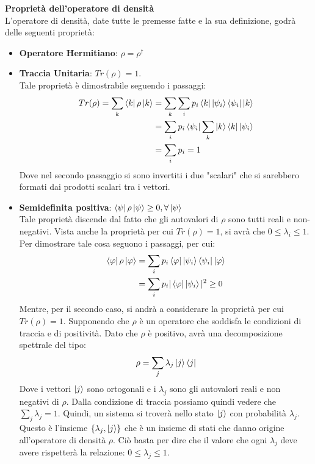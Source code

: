 \newpage
\begin{info}
\textbf{Proprietà dell'operatore di densità}\\
L'operatore di densità, date tutte le premesse fatte e la sua definizione, godrà delle seguenti proprietà:
\begin{itemize}
       \item \textbf{Operatore Hermitiano}: \(\rho = \rho^\dagger\)
       
       \item \textbf{Traccia Unitaria}: \(Tr(\rho) = 1\).\\
       Tale proprietà è dimostrabile seguendo i passaggi:
       \begin{align*}
              Tr(\rho)=\sum_{k} \bra{k}\rho\ket{k}&=\sum_{k}\sum_{i}p_i \bra{k}\ket{\psi_i}\bra{\psi_i}\ket{k}\\
              &= \sum_{i}p_i \bra{\psi_i}\sum_{k}\ket{k}\bra{k}\ket{\psi_i}\\
              &=\sum_{i} p_i = 1
       \end{align*}
       Dove nel secondo passaggio si sono invertiti i due "scalari" che si sarebbero formati dai prodotti scalari tra i vettori.

       \item \textbf{Semidefinita positiva}: \(\bra{\psi}\rho \ket{\psi} \ge 0, \forall \ket{\psi}\)\\
       Tale proprietà discende dal fatto che gli autovalori di \(\rho\) sono tutti reali e non-negativi. Vista anche la proprietà per cui \(Tr(\rho)=1\), si avrà che \(0 \le \lambda_i \le 1\). Per dimostrare tale cosa seguono i passaggi, per cui:
       \begin{align*}
              \bra{\varphi}\rho\ket{\varphi} &=\sum_{i} p_i \bra{\varphi} \ket{\psi_i}\bra{\psi_i}\ket{\varphi}\\
              &= \sum_{i} p_i |\bra{\varphi}\ket{\psi_i}|^2 \ge 0
       \end{align*}
       Mentre, per il secondo caso, si andrà a considerare la proprietà per cui \(Tr(\rho)=1\). Supponendo che \(\rho\) è un operatore che soddisfa le condizioni di traccia e di positività. Dato che \(\rho\) è positivo, avrà una decomposizione spettrale del tipo:
       \begin{gather*}
       \rho = \sum_{j}\lambda_j \ket{j}\bra{j}
       \end{gather*}
       Dove i vettori \(\ket{j}\) sono ortogonali e i \(\lambda_j\) sono gli autovalori reali e non negativi di \(\rho\).
       Dalla condizione di traccia possiamo quindi vedere che \(\sum_{j}\lambda_j = 1\). Quindi, un sistema si troverà nello stato \(\ket{j}\) con probabilità \(\lambda_j\). Questo è l'insieme \(\{\lambda_j, \ket{j}\}\) che è un insieme di stati che danno origine all'operatore di densità \(\rho\). Ciò basta per dire che il valore che ogni \(\lambda_j\) deve avere rispetterà la relazione: \(0 \le \lambda_j \le 1\). 
\end{itemize}
\end{info}


